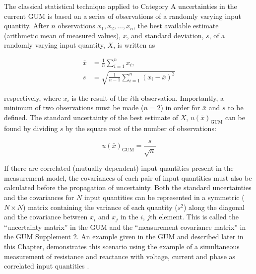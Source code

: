 \documentclass[../thesis/thesis.tex]{subfiles}
\begin{document}
The classical statistical technique \cite{Neyman_1937} applied to Category A uncertainties in the current GUM is based on a series of observations of a randomly varying input quantity. After $n$ observations $x_1,x_2,\dots,x_n$, the best available estimate (arithmetic mean of measured values), $\bar{x}$, and standard deviation, $s$, of a randomly varying input quantity, $X$, is written as

\begin{align}
\bar{x} & =\frac{1}{n}\sum_{i=1}^{n}x_i,\\
s & =\sqrt{\frac{1}{n-1}\sum_{i=1}^{n}(x_i-\bar{x})^2}
\end{align}

respectively, where $x_i$ is the result of the $i$th observation. Importantly, a minimum of two observations must be made ($n=2$) in order for $\bar{x}$ and $s$ to be defined. The standard uncertainty of the best estimate of $X$, $u(\bar{x})_{\textrm{GUM}}$ can be found by dividing $s$ by the square root of the number of observations:

\begin{equation}
u(\bar{x})_{\textrm{GUM}}=\frac{s}{\sqrt{n}}
\label{ch3_eqn_ux_gum}
\end{equation}

If there are correlated (mutually dependent) input quantities present in the measurement model, the covariances of each pair of input quantities must also be calculated before the propagation of uncertainty. Both the standard uncertainties and the covariances for $N$ input quantities can be represented in a symmetric ($N\times N$) matrix containing the variance of each quantity ($s^2$) along the diagonal and the covariance between $x_i$ and $x_j$ in the $i$, $j$th element. This is called the “uncertainty matrix” in the GUM and the “measurement covariance matrix” in the GUM Supplement 2. An example given in the GUM and described later in this Chapter, demonstrates this scenario using the example of a simultaneous measurement of resistance and reactance with voltage, current and phase as correlated input quantities \cite[Example~H.2]{GUM_2008}. 
\end{document}
